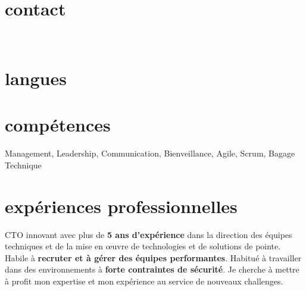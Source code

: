 \documentclass{friggeri-cv} 	%
\begin{document}


\begin{aside} %
\section{contact}
\myAddress
~
\myPhoneNumber
~
\myReferences
\section{langues}
\myLanguages
\section{compétences}
Management, Leadership,
Communication,
Bienveillance,
Agile, Scrum,
Bagage Technique
\end{aside}

\section{expériences professionnelles}

CTO innovant avec plus de \textbf{5 ans d'expérience} dans la direction des équipes techniques et de la mise en œuvre de 
technologies et de solutions de pointe. Habile à \textbf{recruter et à gérer des équipes performantes}. 
Habitué à travailler dans des environnements à \textbf{forte contraintes de sécurité}.
Je cherche à mettre à profit mon expertise et mon expérience au service de nouveaux challenges.
\end{document}
